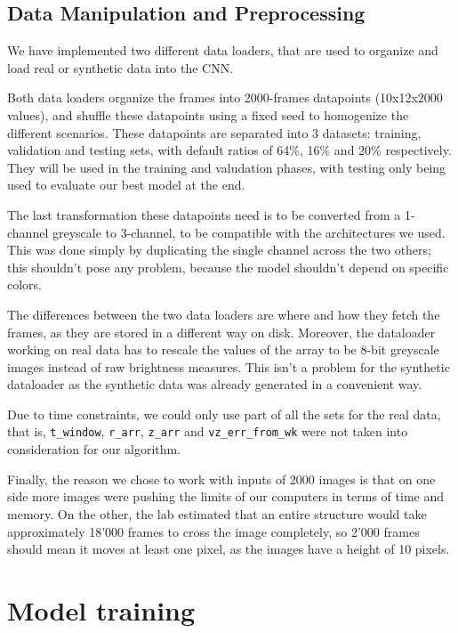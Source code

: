 \documentclass[10pt,conference]{IEEEtran}
\begin{document}
\subsection{Data Manipulation and Preprocessing}
We have implemented two different data loaders, that are used to organize and load real or synthetic data into the CNN.\par
Both data loaders organize the frames into 2000-frames datapoints (10x12x2000 values), and shuffle these datapoints using a fixed seed to homogenize the different scenarios. These datapoints are separated into 3 datasets: training, validation and testing sets, with default ratios of 64\%, 16\% and 20\% respectively. They will be used in the training and valudation phases, with testing only being used to evaluate our best model at the end.\par
The last transformation these datapoints need is to be converted from a 1-channel greyscale to 3-channel, to be compatible with the architectures we used. This was done simply by duplicating the single channel across the two others; this shouldn't pose any problem, because the model shouldn't depend on specific colors.\par
The differences between the two data loaders are where and how they fetch the frames, as they are stored in a different way on disk. Moreover, the dataloader working on real data has to rescale the values of the array to be 8-bit greyscale images instead of raw brightness measures. This isn't a problem for the synthetic dataloader as the synthetic data was already generated in a convenient way.

Due to time constraints, we could only use part of all the sets for the real data, that is, \texttt{t\_window}, \texttt{r\_arr}, \texttt{z\_arr} and \texttt{vz\_err\_from\_wk} were not taken into consideration for our algorithm.\par
Finally, the reason we chose to work with inputs of 2000 images is that on one side more images were pushing the limits of our computers in terms of time and memory. On the other, the lab estimated that an entire structure would take approximately 18'000 frames to cross the image completely, so 2'000 frames should mean it moves at least one pixel, as the images have a height of 10 pixels.\par

\section{Model training}
 
\end{document}
